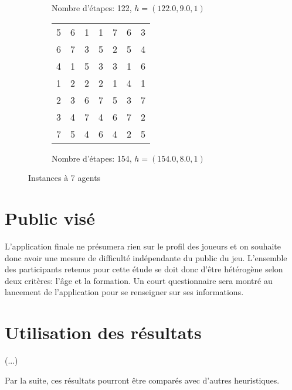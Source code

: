 \documentclass[a4paper, 10pt]{article}
\newcommand{\bb}[1]{\colorbox{blue!30}{#1}}
\begin{document}
\begin{figure}[h]
\begin{subfigure}[h]{0.45\textwidth}
\begin{tabular}{|c c c c c c c|}
		\hline
	\end{tabular}
	\caption{Nombre d'étapes: 122, $h = (122.0, 9.0, 1)$}
\end{subfigure}
\begin{subfigure}[h]{0.45\textwidth}
	\centering
	\begin{tabular}{|c c c c c c c|}
		\hline
		5 & 6 & 1 & 1 & 7 & \bb{6} & 3 \\
		6 & \bb{7} & \bb{3} & \bb{5} & \bb{2} & 5 & \bb{4} \\
		4 & 1 & 5 & 3 & 3 & 1 & 6 \\
		\bb{1} & 2 & 2 & 2 & 1 & 4 & 1 \\
		2 & 3 & 6 & 7 & 5 & 3 & 7 \\
		3 & 4 & 7 & 4 & 6 & 7 & 2 \\
		7 & 5 & 4 & 6 & 4 & 2 & 5 \\
		\hline
	\end{tabular}
	\caption{Nombre d'étapes: 154, $h = (154.0, 8.0, 1)$}
\end{subfigure}
\caption{Instances à 7 agents}
\end{figure}
	
	\section*{Public visé}
	
	L'application finale ne présumera rien sur le profil des joueurs et on souhaite donc avoir une mesure de difficulté indépendante du public du jeu. L'ensemble des participants retenus pour cette étude se doit donc d'être hétérogène selon deux critères: l'âge et la formation. Un court questionnaire sera montré au lancement de l'application pour se renseigner sur ses informations.
	
	\section*{Utilisation des résultats}
	
	(...)
	
	Par la suite, ces résultats pourront être comparés avec d'autres heuristiques.
	
\end{document}
